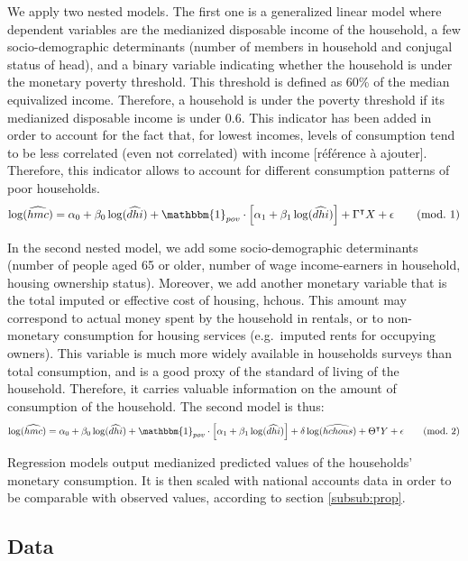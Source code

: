 \documentclass[12pt]{article}
\begin{document}
We apply two nested models. The first one is a generalized linear model where dependent variables are the medianized disposable income of the household, a few socio-demographic determinants (number of members in household and conjugal status of head), and a binary variable indicating whether the household is under the monetary poverty threshold. This threshold is defined as 60\% of the median equivalized income. Therefore, a household is under the poverty threshold if its medianized disposable income is under 0.6. This indicator has been added in order to account for the fact that, for lowest incomes, levels of consumption tend to be less correlated (even not correlated) with income [référence à ajouter]. Therefore, this indicator allows to account for different consumption patterns of poor households.
\begin{equation}
\label{equ:mod1}
    \log(\widehat{hmc}) = \alpha_0 +\beta_0\log(\widehat{dhi})
    + \mathbbm{1}_{pov}\cdot\left[\alpha_1 + \beta_1\log(\widehat{dhi})\right] + \Gamma^\intercal X + \epsilon
    \tag{mod.\ 1}
\end{equation}

In the second nested model, we add some socio-demographic determinants (number of people aged 65 or older, number of wage income-earners in household, housing ownership status). Moreover, we add another monetary variable that is the total imputed or effective cost of housing, hchous. This amount may correspond to actual money spent by the household in rentals, or to non-monetary consumption for housing services (e.g.\ imputed rents for occupying owners). This variable is much more widely available in households surveys than total consumption, and is a good proxy of the standard of living of the household. Therefore, it carries valuable information on the amount of consumption of the household. The second model is thus:
\begin{equation}
\label{equ:mod2}
    \log(\widehat{hmc}) = \alpha_0 +\beta_0\log(\widehat{dhi})
    + \mathbbm{1}_{pov}\cdot\left[\alpha_1 + \beta_1\log(\widehat{dhi})\right]
    + \delta\log(\widehat{hchous}) + \Theta^\intercal Y + \epsilon
    \tag{mod.\ 2}
\end{equation}


Regression models output medianized predicted values of the households' monetary consumption. It is then scaled with national accounts data in order to be comparable with observed values, according to section \ref{subsub:prop}.


\subsection{Data}
\end{document}
